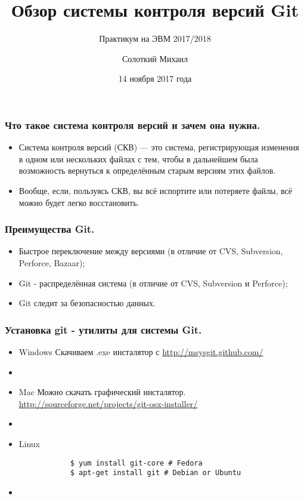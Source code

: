 \documentclass[]{beamer}
\title[Git]{\bfseries Обзор системы контроля версий Git}
\author[Cолоткий~М.]{Солоткий Михаил}
\subtitle{Практикум на ЭВМ 2017/2018}
\institute[ВМК МГУ]{МГУ имени М. В. Ломоносова, факультет ВМК, кафедра ММП}
\date{14 ноября 2017 года}
\begin{document}

\begin{frame}
	\titlepage
\end{frame}

\begin{frame} \frametitle{Что такое система контроля версий и зачем она нужна.}
	\begin{itemize}
		\item Система контроля версий (СКВ) — это система, регистрирующая изменения в одном или нескольких файлах с тем, чтобы в дальнейшем была возможность вернуться к определённым старым версиям этих файлов. \newline \par
		\item Вообще, если, пользуясь СКВ, вы всё испортите или потеряете файлы, всё можно будет легко восстановить.
	\end{itemize}
\end{frame}

\begin{frame} \frametitle{Преимущества Git.}
	\begin{itemize}
		\item Быстрое переключение между версиями (в отличие от CVS, Subversion, Perforce, Bazaar); \newline \par
		\item Git - распределённая система (в отличие от CVS, Subversion и Perforce); \newline \par
		\item Git следит за безопасностью данных. \newline \par
	\end{itemize}
\end{frame}

\begin{frame}[fragile] \frametitle{Установка git - утилиты для системы Git.}
	\begin{itemize}
		\item Windows \newline
		Скачиваем .exe инсталятор с \url{http://msysgit.github.com/}
		\item[~]

		\item Mac \newline
		Можно скачать графический инсталятор. \newline
		\url{http://sourceforge.net/projects/git-osx-installer/}
		\item[~]

		\item Linux
		\begin{verbatim}
			$ yum install git-core # Fedora
			$ apt-get install git # Debian or Ubuntu
		\end{verbatim}
		\item[~]
	\end{itemize}
\end{frame}
\end{document}

